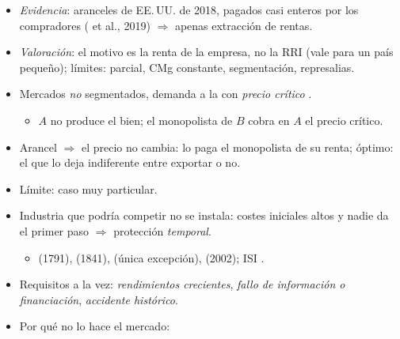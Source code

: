 \documentclass{article}
\begin{document}
\begin{columnas}
\begin{itemize}
  \begin{itemize}
  \item CMg ↓ con la producción total: reservar el mercado $\Rightarrow$ ↓ CMg $\Rightarrow$ ↑ ventas fuera.
  \item Memorias de 16K: decisivo para exportar, pero costó a Japón más de lo que le dio (-, 1986).
  \end{itemize}
\item \emph{Evidencia}: aranceles de EE.\,UU. de 2018, pagados casi enteros por los compradores ( et al., 2019) $\Rightarrow$ apenas extracción de rentas.
\item \emph{Valoración}: el motivo es la renta de la empresa, no la RRI (vale para un país pequeño); límites: parcial, CMg constante, segmentación, represalias.
\end{itemize}
\begin{itemize}
\item Mercados \emph{no} segmentados, demanda a la  con \emph{precio crítico} .
  \begin{itemize}
  \item $A$ no produce el bien; el monopolista de $B$ cobra en $A$ el precio crítico.
  \end{itemize}
\item Arancel $\Rightarrow$ el precio no cambia: lo paga el monopolista de su renta; óptimo: el que lo deja indiferente entre exportar o no.
\item Límite: caso muy particular.
\end{itemize}
\begin{itemize}
\item Industria que podría competir no se instala: costes iniciales altos y nadie da el primer paso $\Rightarrow$ protección \emph{temporal}.
  \begin{itemize}
  \item {} (1791),  (1841),  (única excepción),  (2002); ISI .
  \end{itemize}
\item Requisitos a la vez: \emph{rendimientos crecientes}, \emph{fallo de información o financiación}, \emph{accidente histórico}.
\item Por qué no lo hace el mercado:
  \begin{itemize}

\end{itemize}
\end{itemize}
\end{columnas}
\end{document}
